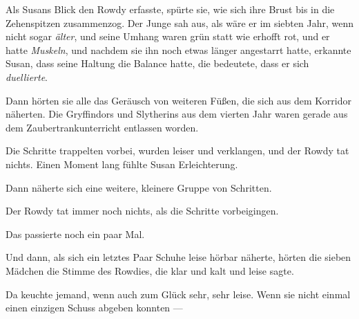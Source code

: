 Als Susans Blick den Rowdy erfasste, spürte sie, wie sich ihre Brust bis in die Zehenspitzen zusammenzog. Der Junge sah aus, als wäre er im siebten Jahr, wenn nicht sogar \emph{älter}, und seine Umhang waren grün statt wie erhofft rot, und er hatte \emph{Muskeln}, und nachdem sie ihn noch etwas länger angestarrt hatte, erkannte Susan, dass seine Haltung die Balance hatte, die bedeutete, dass er sich \emph{duellierte}.

Dann hörten sie alle das Geräusch von weiteren Füßen, die sich aus dem Korridor näherten. Die Gryffindors und Slytherins aus dem vierten Jahr waren gerade aus dem Zaubertrankunterricht entlassen worden.

Die Schritte trappelten vorbei, wurden leiser und verklangen, und der Rowdy tat nichts. Einen Moment lang fühlte Susan Erleichterung.

Dann näherte sich eine weitere, kleinere Gruppe von Schritten.

Der Rowdy tat immer noch nichts, als die Schritte vorbeigingen.

Das passierte noch ein paar Mal.

Und dann, als sich ein letztes Paar Schuhe leise hörbar näherte, hörten die sieben Mädchen die Stimme des Rowdies, die klar und kalt und leise  sagte.

Da keuchte jemand, wenn auch zum Glück sehr, sehr leise. Wenn sie nicht einmal einen einzigen Schuss abgeben konnten —

